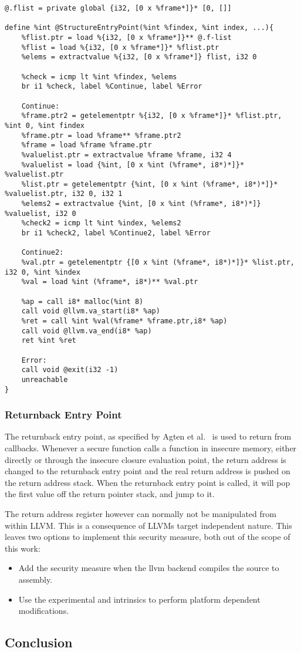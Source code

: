 \begin{lstlisting}
@.flist = private global {i32, [0 x %frame*]}* [0, []]

define %int @StructureEntryPoint(%int %findex, %int index, ...){
    %flist.ptr = load %{i32, [0 x %frame*]}** @.f-list
    %flist = load %{i32, [0 x %frame*]}* %flist.ptr
    %elems = extractvalue %{i32, [0 x %frame*]} flist, i32 0
    
    %check = icmp lt %int %findex, %elems
    br i1 %check, label %Continue, label %Error
    
    Continue:
    %frame.ptr2 = getelementptr %{i32, [0 x %frame*]}* %flist.ptr, %int 0, %int findex
    %frame.ptr = load %frame** %frame.ptr2
    %frame = load %frame %frame.ptr
    %valuelist.ptr = extractvalue %frame %frame, i32 4
    %valuelist = load {%int, [0 x %int (%frame*, i8*)*]}* %valuelist.ptr
    %list.ptr = getelementptr {%int, [0 x %int (%frame*, i8*)*]}* %valuelist.ptr, i32 0, i32 1
    %elems2 = extractvalue {%int, [0 x %int (%frame*, i8*)*]} %valuelist, i32 0
    %check2 = icmp lt %int %index, %elems2
    br i1 %check2, label %Continue2, label %Error
    
    Continue2:
    %val.ptr = getelementptr {[0 x %int (%frame*, i8*)*]}* %list.ptr, i32 0, %int %index
    %val = load %int (%frame*, i8*)** %val.ptr

    %ap = call i8* malloc(%int 8)
    call void @llvm.va_start(i8* %ap)
    %ret = call %int %val(%frame* %frame.ptr,i8* %ap)
    call void @llvm.va_end(i8* %ap)
    ret %int %ret
    
    Error:
    call void @exit(i32 -1)
    unreachable
}
\end{lstlisting}

\subsubsection{Returnback Entry Point}
The returnback entry point, as specified by Agten et al.~\cite{Agten:2012:SCM:2354412.2355247} is used to return from callbacks.
Whenever a secure function calls a function in insecure memory, either directly or through the insecure closure evaluation point, the return address is changed to the returnback entry point and the real return address is pushed on the return address stack. When the returnback entry point is called, it will pop the first value off the return pointer stack, and jump to it.

The return address register however can normally not be manipulated from within LLVM. This is a consequence of LLVMs target independent nature.
This leaves two options to implement this security measure, both out of the scope of this work:
\begin{itemize}
\item 
Add the security measure when the llvm backend compiles the \LLVMIR source to assembly.

\item 
Use the experimental  and  intrinsics to perform platform dependent modifications.
\end{itemize}

\subsection{Conclusion}
